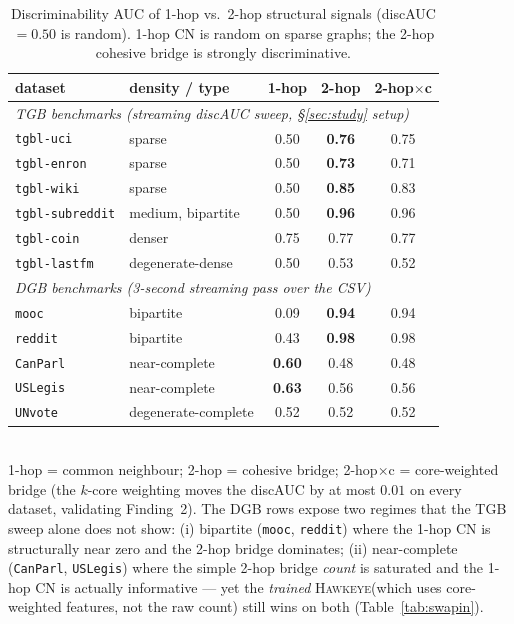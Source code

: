 \documentclass[sigconf,nonacm,review]{acmart}
\newcommand{\method}{\textsc{Hawkeye}\xspace}
\begin{document}
\begin{table}[t]
\caption{Discriminability AUC of 1-hop vs.\ 2-hop structural signals
(discAUC $=0.50$ is random). 1-hop CN is random on sparse graphs; the 2-hop
cohesive bridge is strongly discriminative.}
\label{tab:discauc}
\centering\small
\setlength{\tabcolsep}{4pt}
\begin{tabular}{llccc}
\toprule
dataset & density / type & 1-hop & 2-hop & 2-hop$\times$c \\
\midrule
\multicolumn{5}{l}{\emph{TGB benchmarks (streaming discAUC sweep, \S\ref{sec:study} setup)}} \\
\texttt{tgbl-uci}       & sparse              & 0.50 & \textbf{0.76} & 0.75 \\
\texttt{tgbl-enron}     & sparse              & 0.50 & \textbf{0.73} & 0.71 \\
\texttt{tgbl-wiki}      & sparse              & 0.50 & \textbf{0.85} & 0.83 \\
\texttt{tgbl-subreddit} & medium, bipartite   & 0.50 & \textbf{0.96} & 0.96 \\
\texttt{tgbl-coin}      & denser              & 0.75 & 0.77 & 0.77 \\
\texttt{tgbl-lastfm}    & degenerate-dense    & 0.50 & 0.53 & 0.52 \\
\midrule
\multicolumn{5}{l}{\emph{DGB benchmarks (3-second streaming pass over the CSV)}} \\
\texttt{mooc}           & bipartite           & 0.09 & \textbf{0.94} & 0.94 \\
\texttt{reddit}         & bipartite           & 0.43 & \textbf{0.98} & 0.98 \\
\texttt{CanParl}        & near-complete       & \textbf{0.60} & 0.48 & 0.48 \\
\texttt{USLegis}        & near-complete       & \textbf{0.63} & 0.56 & 0.56 \\
\texttt{UNvote}         & degenerate-complete & 0.52 & 0.52 & 0.52 \\
\bottomrule
\end{tabular}
\\[2pt]
{\footnotesize 1-hop = common neighbour; 2-hop = cohesive bridge;
2-hop$\times$c = core-weighted bridge (the $k$-core weighting moves
the discAUC by at most $0.01$ on every dataset, validating Finding~2).
The DGB rows expose two regimes that the TGB sweep alone does not show:
(i) bipartite (\texttt{mooc}, \texttt{reddit}) where the 1-hop CN is
structurally near zero and the 2-hop bridge dominates; (ii)
near-complete (\texttt{CanParl}, \texttt{USLegis}) where the simple
2-hop bridge \emph{count} is saturated and the 1-hop CN is actually
informative --- yet the \emph{trained} \method (which uses core-weighted
features, not the raw count) still wins on both (Table~\ref{tab:swapin}).}
\end{table}
\end{document}
